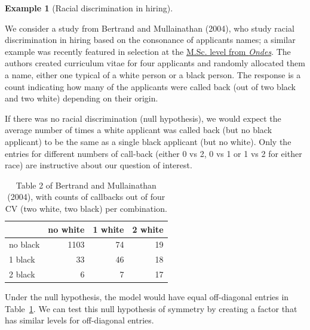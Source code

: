 \documentclass[
  11pt,
  letterpaper,
]{scrbook}
\theoremstyle{definition}
\newtheorem{example}{Example}[chapter]
\theoremstyle{definition}
\theoremstyle{remark}
\begin{document}
\begin{example}[Racial discrimination in
hiring]\protect\hypertarget{exm-racial-chisq}{}\label{exm-racial-chisq}

We consider a study from Bertrand and Mullainathan (2004), who study
racial discrimination in hiring based on the consonance of applicants
names; a similar example was recently featured in selection at the
\href{https://ondes.univ-gustave-eiffel.fr/fileadmin/contributeurs/ONDES/Publications/ONDES_WP_23_01.pdf}{M.Sc.
level from \emph{Ondes}}. The authors created curriculum vitae for four
applicants and randomly allocated them a name, either one typical of a
white person or a black person. The response is a count indicating how
many of the applicants were called back (out of two black and two white)
depending on their origin.

If there was no racial discrimination (null hypothesis), we would expect
the average number of times a white applicant was called back (but no
black applicant) to be the same as a single black applicant (but no
white). Only the entries for different numbers of call-back (either 0 vs
2, 0 vs 1 or 1 vs 2 for either race) are instructive about our question
of interest.

\begin{longtable}[]{@{}lrrr@{}}

\caption{\label{tbl-BM04T2tab}Table 2 of Bertrand and Mullainathan
(2004), with counts of callbacks out of four CV (two white, two black)
per combination.}

\tabularnewline

\toprule\noalign{}
& no white & 1 white & 2 white \\
\midrule\noalign{}
\endhead
\bottomrule\noalign{}
\endlastfoot
no black & 1103 & 74 & 19 \\
1 black & 33 & 46 & 18 \\
2 black & 6 & 7 & 17 \\

\end{longtable}

Under the null hypothesis, the model would have equal off-diagonal
entries in Table~\ref{tbl-BM04T2tab}. We can test this null hypothesis
of symmetry by creating a factor that has similar levels for
off-diagonal entries.


\end{example}
\end{document}
